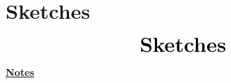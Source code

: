 \documentclass[10pt]{beamer}
\begin{document}
\section{Sketches}
\begin{frame}
	\begin{eqnarray*}
		&\text{{\huge \textbf{Sketches}}}\\
	\end{eqnarray*}
\end{frame}
\begin{flushleft}
	\underline{\textbf{Notes}}\setlength{\parskip}{.15cm}\notesize\newline\par
\end{flushleft}

\end{document}
